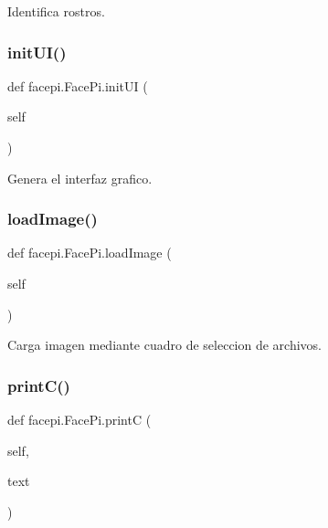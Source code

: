 Identifica rostros. 

\mbox{\label{classfacepi_1_1_face_pi_ad558e4b8c0cf5a01e4eb8ea7aad5cd77}} 
\subsubsection{\texorpdfstring{init\+U\+I()}{initUI()}}
{\footnotesize\ttfamily def facepi.\+Face\+Pi.\+init\+UI (\begin{DoxyParamCaption}\item[{}]{self }\end{DoxyParamCaption})}



Genera el interfaz grafico. 

\mbox{\label{classfacepi_1_1_face_pi_acaaf24b558c23d9c2831cbfc67e1fed7}} 
\subsubsection{\texorpdfstring{load\+Image()}{loadImage()}}
{\footnotesize\ttfamily def facepi.\+Face\+Pi.\+load\+Image (\begin{DoxyParamCaption}\item[{}]{self }\end{DoxyParamCaption})}



Carga imagen mediante cuadro de seleccion de archivos. 

\mbox{\label{classfacepi_1_1_face_pi_ac94b516a6dd221032d2ec103f8af3242}} 
\subsubsection{\texorpdfstring{print\+C()}{printC()}}
{\footnotesize\ttfamily def facepi.\+Face\+Pi.\+printC (\begin{DoxyParamCaption}\item[{}]{self,  }\item[{}]{text }\end{DoxyParamCaption})}



